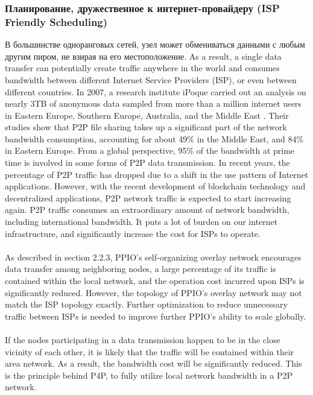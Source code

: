 \documentclass[10pt,a4paper]{article}
\begin{document}
\subsubsection{Планирование, дружественное к интернет-провайдеру (ISP Friendly Scheduling)}  %
В большинстве одноранговых сетей, узел может обмениваться данными с любым другим пиром, не взирая на его местоположение. As a result, a single data transfer can potentially create traffic anywhere in the world and consumes bandwidth between different Internet Service Providers (ISP), or even between different countries. In 2007, a research institute iPoque carried out an analysis on nearly 3TB of anonymous data sampled from more than a million internet users in Eastern Europe, Southern Europe, Australia, and the Middle East \cite{article26}. Their studies show that P2P file sharing takes up a significant part of the network bandwidth consumption, accounting for about 49\% in the Middle East, and 84\% in Eastern Europe. From a global perspective, 95\% of the bandwidth at prime time is involved in some forms of P2P data transmission. In recent years, the percentage of P2P traffic has dropped due to a shift in the use pattern of Internet applications. However, with the recent development of blockchain technology and decentralized applications, P2P network traffic is expected to start increasing again. P2P traffic consumes an extraordinary amount of network bandwidth, including international bandwidth. It puts a lot of burden on our internet infrastructure, and significantly increase the cost for ISPs to operate.
\vspace{-0.5em}
 \\ \\As described in section 2.2.3, PPIO’s self-organizing overlay network encourages data transfer among neighboring nodes, a large percentage of its traffic is contained within the local network, and the operation cost incurred upon ISPs is significantly reduced. However, the  topology of PPIO’s overlay network may not match the ISP topology exactly. Further optimization to reduce unnecessary traffic between ISPs is needed to improve further PPIO’s ability to scale globally.
 \vspace{-0.5em}
 \\ \\If the nodes participating in a data transmission happen to be in the close vicinity of each other, it is likely that the traffic will be contained within their area network. As a result, the bandwidth cost will be significantly reduced. This is the principle behind P4P, to fully utilize local network bandwidth in a P2P network.  
\end{document}
